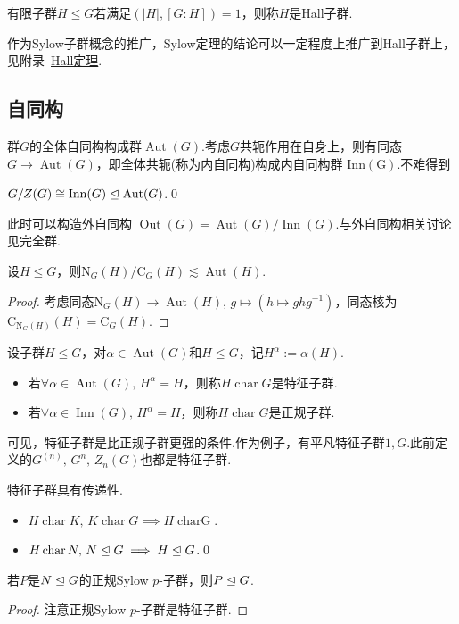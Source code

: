 有限子群$H\le G$若满足$(|H|,[G:H])=1$，则称$H$是{\heiti Hall子群}.

作为Sylow子群概念的推广，Sylow定理的结论可以一定程度上推广到Hall子群上，见附录~\hyperlink{thm:Hall}{Hall定理}.
\subsection{自同构}
群$G$的全体自同构构成群$\operatorname*{Aut}(G)$.考虑$G$共轭作用在自身上，则有同态$G\to\operatorname*{Aut}(G)$，即全体共轭(称为{\heiti 内自同构})构成{\heiti 内自同构群} $\operatorname*{Inn(G)}$.不难得到
\begin{prop}
	$G/Z(G)\cong\operatorname*{Inn}(G)\trianglelefteq\operatorname*{Aut}(G)$.\qed
\end{prop}

此时可以构造{\heiti 外自同构} $\operatorname*{Out}(G)=\operatorname*{Aut}(G)/\operatorname*{Inn}(G)$.与外自同构相关讨论见完全群.%

\begin{thm}[(N/C定理)]
	设$H\le G$，则$\mathrm{N}_G(H)/\mathrm{C}_G(H)\lesssim\operatorname*{Aut}(H)$.
\end{thm}
\begin{proof}
	考虑同态$\mathrm{N}_G(H)\to\operatorname*{Aut}(H),\,g\mapsto(h\mapsto ghg^{-1})$，同态核为$\mathrm{C}_{\mathrm{N}_G(H)}(H)=\mathrm{C}_G(H)$.
\end{proof}

\begin{definition}
	设子群$H\le G$，对$\alpha\in\operatorname*{Aut}(G)$和$H\le G$，记$H^\alpha:=\alpha(H)$.
	\begin{itemize}
		\item 若$\forall\alpha\in\operatorname*{Aut}(G),\,H^\alpha=H$，则称$H\operatorname*{char}G$是{\heiti 特征子群}.
		\item 若$\forall\alpha\in\operatorname*{Inn}(G),\,H^\alpha=H$，则称$H\operatorname*{char}G$是{\heiti 正规子群}.
	\end{itemize}
\end{definition}

可见，特征子群是比正规子群更强的条件.作为例子，有平凡特征子群$1,G$.此前定义的$G^{(n)},\,G^n,\,Z_n(G)$也都是特征子群.
\begin{prop}
	特征子群具有传递性.
	\begin{itemize}
		\item $H\operatorname*{char}K,\,K\operatorname*{char} G\implies H\operatorname*{char G}$.
		\item $H\operatorname*{char} N,\,N\trianglelefteq G\implies H\trianglelefteq G$.\qed
	\end{itemize}
\end{prop}
\begin{cor}
	若$P$是$N\trianglelefteq G$的正规Sylow $p$-子群，则$P\trianglelefteq G$.
\end{cor}
\begin{proof}
	注意正规Sylow $p$-子群是特征子群.
\end{proof}

